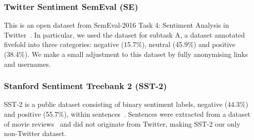 \documentclass{article}
\begin{document}
\subsubsection{Twitter Sentiment SemEval (SE)}
This is an open dataset from SemEval-2016 Task 4: Sentiment Analysis in Twitter~\cite{nakov2019semeval}.
In particular, we used the dataset for subtask A, a dataset annotated fivefold into three categories: negative (15.7\%), neutral (45.9\%) and positive (38.4\%).
We make a small adjustment to this dataset by fully anonymising links and usernames.

\subsubsection{Stanford Sentiment Treebank 2 (SST-2)}
SST-2 is a public dataset consisting of binary sentiment labels, negative (44.3\%) and positive (55.7\%), within sentences~\cite{socher2013recursive}.
Sentences were extracted from a dataset of movie reviews~\cite{pang2005seeing} and did not originate from Twitter, making SST-2 our only non-Twitter dataset.
\end{document}
